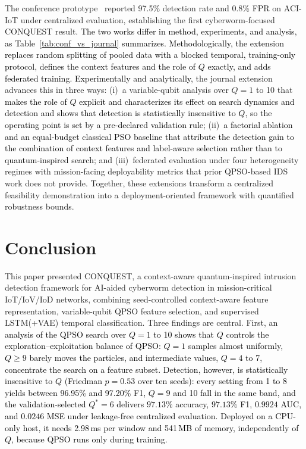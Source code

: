 \documentclass[conference]{IEEEtran}
\begin{document}
The conference prototype~\cite{ajakweconquest} reported
97.5\% detection rate and 0.8\% FPR on ACI-IoT under
centralized evaluation, establishing the first
cyberworm-focused CONQUEST result. \textcolor{black}{The
two works differ in method, experiments, and analysis,
as Table~\ref{tab:conf_vs_journal} summarizes. Methodologically, the extension
replaces random splitting of pooled data with a blocked temporal,
training-only protocol, defines the context features and the role
of $Q$ exactly, and adds federated training. Experimentally and
analytically,} the journal extension
advances this in three ways: (i)~a
variable-qubit analysis over $Q=1$ to 10
that \textcolor{black}{makes the role of $Q$ explicit and
characterizes its effect on search dynamics and detection}
\textcolor{black}{and shows that detection is statistically
insensitive to $Q$, so the operating point is set by a pre-declared
validation rule}; (ii)~\textcolor{black}{a factorial ablation
and an equal-budget classical PSO baseline that attribute the
detection gain to the combination of context features and
label-aware selection rather than to quantum-inspired search};
and (iii)~federated
evaluation under four heterogeneity regimes with
mission-facing deployability metrics that prior
QPSO-based IDS work does not provide. Together, these
extensions transform a centralized feasibility demonstration
into a deployment-oriented framework with quantified
robustness bounds.





\section{Conclusion}
\label{sec:conclusion}

This paper presented CONQUEST, a context-aware
quantum-inspired intrusion detection framework for AI-aided
cyberworm detection in mission-critical IoT/IoV/IoD networks,
combining seed-controlled context-aware feature representation,
variable-qubit QPSO feature selection, and supervised
LSTM(+VAE) temporal classification.
Three findings are central. First, \textcolor{black}{an
analysis of the QPSO search over $Q=1$ to 10 shows that $Q$ controls
the exploration--exploitation balance of QPSO: $Q=1$ samples almost
uniformly, $Q\ge9$ barely moves the particles, and intermediate
values, $Q=4$ to 7, concentrate the search on a feature subset.}
\textcolor{black}{Detection, however, is statistically insensitive to
$Q$ (Friedman $p=0.53$ over ten seeds): every setting from 1 to 8
yields between 96.95\% and 97.20\% F1, $Q=9$ and 10 fall in the same
band, and the validation-selected $Q^{*}=6$
delivers $97.13\%$ accuracy, $97.13\%$ F1, $0.9924$ AUC, and
$0.0246$ MSE under leakage-free centralized evaluation.} \textcolor{black}{Deployed
on a CPU-only host, it needs 2.98\,ms per window and 541\,MB of
memory, independently of $Q$, because QPSO runs only during
training.}
\end{document}
